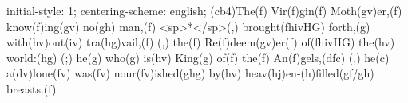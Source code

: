 initial-style: 1;
centering-scheme: english;
(cb4)The(f) Vir(f)gin(f) Moth(gv)er,(f) know(f)ing(gv) no(gh) man,(f) <sp>*</sp>(,) brought(fhivHG) forth,(g) with(hv)out(iv) tra(hg)vail,(f) (,) the(f) Re(f)deem(gv)er(f) of(fhivHG) the(hv) world:(hg) (;) he(g) who(g) is(hv) King(g) of(f) the(f) An(f)gels,(dfc) (,) he(c) a(dv)lone(fv) was(fv) nour(fv)ished(ghg) by(hv) heav(hj)en-(h)filled(gf/gh) breasts.(f)
